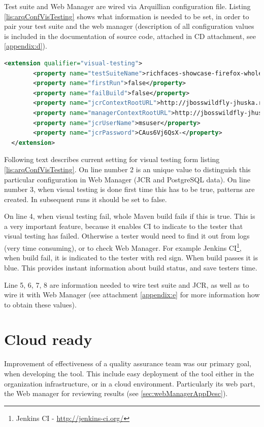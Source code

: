 \documentclass[11pt,oneside,final]{fithesis2}
\begin{document}
  Test suite and Web Manager are wired via Arquillian configuration file. Listing \ref{lis:arqConfVisTesting} shows what information is needed 
  to be set, in order to pair your test suite and the web manager (description of all configuration values is included in the documentation
  of source code, attached in CD attachment, see \ref{appendix:d}).
  
  \begin{lstlisting}[caption=Example of configuration for Graphene Visual Testing Extension,label=lis:arqConfVisTesting,breaklines=true, language=xml]
  <extension qualifier="visual-testing">
        <property name="testSuiteName">richfaces-showcase-firefox-whole</property>      
        <property name="firstRun">false</property>
        <property name="failBuild">false</property>
        <property name="jcrContextRootURL">http://jbosswildfly-jhuska.rhcloud.com/modeshape-rest/graphene-visual-testing/default</property>
        <property name="managerContextRootURL">http://jbosswildfly-jhuska.rhcloud.com/</property>
        <property name="jcrUserName">msuser</property>
        <property name="jcrPassword">CAus6Vj6QsX-</property>
  </extension>
  \end{lstlisting}
  
  Following text describes current setting for visual testing form listing \ref{lis:arqConfVisTesting}. 
  On line number 2 is an unique value to distinguish this particular configuration in Web Manager (JCR and PostgreSQL data).
  On line number 3, when visual testing is done first time this has to be true, patterns are created. In subsequent runs it should be set to
  false. 
  
  On line 4, when visual testing fail, whole Maven build fails if this is true. This is a very important feature, because it enables
  CI to indicate to the tester that visual testing has failed. Otherwise a tester would need to find it out from logs (very time consuming),
  or to check Web Manager. For example Jenkins CI\footnote{Jenkins CI - \url{http://jenkins-ci.org/}}, when build fail, it is indicated to the
  tester with red sign. When build passes it is blue. This provides instant information about build status, and save testers time.
  
  Line 5, 6, 7, 8 are information needed to wire test suite and JCR, as well as to wire it with Web Manager (see attachment \ref{appendix:e}
  for more information how to obtain these values).
  
  \section{Cloud ready}
  \label{sec:cloudReady}
  Improvement of effectiveness of a quality assurance team was our primary goal, when developing the tool. This include easy 
  deployment of the tool either in the organization infrastructure, or in a cloud environment. Particularly its web part, the
  Web manager for reviewing results (see \ref{sec:webManagerAppDesc}).
  
\end{document}
